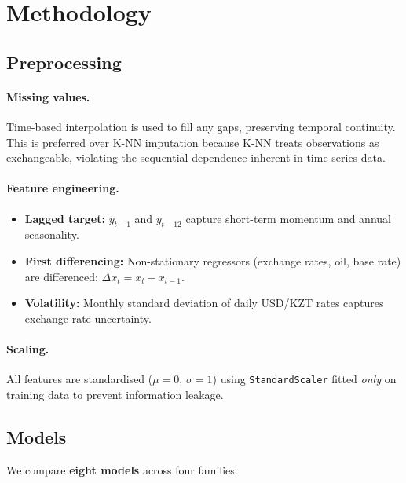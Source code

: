 \documentclass[12pt,a4paper]{article}
\begin{document}
\begin{table}[H]
\section{Methodology}
\label{sec:method}

\subsection{Preprocessing}

\paragraph{Missing values.}
Time-based interpolation is used to fill any gaps, preserving temporal
continuity. This is preferred over K-NN imputation because K-NN treats
observations as exchangeable, violating the sequential dependence
inherent in time series data.

\paragraph{Feature engineering.}
\begin{itemize}[nosep]
    \item \textbf{Lagged target:} $y_{t-1}$ and $y_{t-12}$ capture
          short-term momentum and annual seasonality.
    \item \textbf{First differencing:} Non-stationary regressors
          (exchange rates, oil, base rate) are differenced:
          $\Delta x_t = x_t - x_{t-1}$.
    \item \textbf{Volatility:} Monthly standard deviation of daily
          USD/KZT rates captures exchange rate uncertainty.
\end{itemize}

\paragraph{Scaling.}
All features are standardised ($\mu = 0$, $\sigma = 1$) using
\texttt{StandardScaler} fitted \emph{only} on training data to prevent
information leakage.

\subsection{Models}

We compare \textbf{eight models} across four families:


\end{table}
\end{document}

